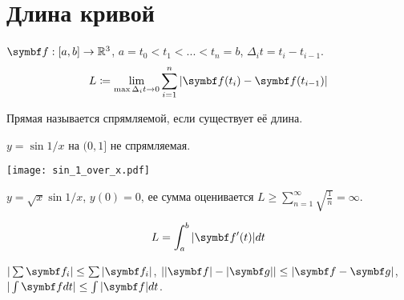 \documentclass[main]{subfiles}
\begin{document}
\chapter{Длина кривой}
\begin{definition}
    $\vf: [a,b] \to \R^3$, $a = t_0 < t_1 < ... < t_n = b$, $\Delta_i t = t_i - t_{i-1}$.
    \[L \coloneqq \lim_{\max \Delta_i t \to 0} \sum_{i=1}^n |\vf(t_i) - \vf(t_{i-1})|\]
\end{definition}

\begin{definition}
    Прямая называется спрямляемой, если существует её длина.
\end{definition}
\begin{example}
    $y = \sin 1/x$  на $(0, 1]$ не спрямляемая.
    \begin{center}
        \texttt{[image: sin\_1\_over\_x.pdf]}
    \end{center}
\end{example}
\begin{example}
    $y = \sqrt{x} \sin 1/x$, $y(0) = 0$, ее сумма оценивается $L \ge \sum_{n=1}^\infty \sqrt{\frac{1}{n}} = \infty$.
\end{example}
\begin{theorem}
    \[L = \int_a^b |\vf'(t)| dt \]
\end{theorem}
\begin{remark}
    $|\sum \vf_i| \le \sum |\vf_i|$, $||\vf| - |\vg|| \le |\vf - \vg|$, $|\int \vf dt| \le \int |\vf| dt$.
\end{remark}
\end{document}
